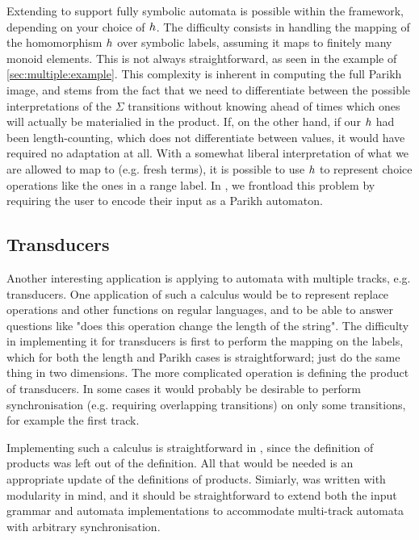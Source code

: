 \documentclass[acmsmall,review,anonymous,screen]{acmart}\settopmatter{printfolios=true,printccs=true,printacmref=true}
\theoremstyle{definition}
\begin{document}
Extending \Calculus{} to support fully symbolic automata is possible within the
framework, depending on your choice of $h$. The difficulty consists in
handling the mapping of the homomorphism $h$ over symbolic labels, assuming
it maps to finitely many monoid elements. This is not always straightforward, as
seen in the example of \cref{sec:multiple:example}. This complexity is inherent
in computing the full Parikh image, and stems from the fact that we need to
differentiate between the possible interpretations of the $\Sigma$ transitions
without knowing ahead of times which ones will actually be materialied in the
product. If, on the other hand, if our $h$ had been length-counting, which
does not differentiate between values, it would have required no adaptation at
all. With a somewhat liberal interpretation of what we are allowed to map to
(e.g. fresh terms), it is possible to use $h$ to represent choice operations
like the ones in a range label. In \Catra{}, we frontload this problem by
requiring the user to encode their input as a Parikh automaton. 

\subsection{Transducers}\label{sec:ext:transducers}

Another interesting application is applying \Calculus{} to automata with
multiple tracks, e.g. transducers. One application of such a calculus would be
to represent replace operations and other functions on regular languages, and to
be able to answer questions like "does this operation change the length of the
string". The difficulty in implementing it for transducers is first to perform
the mapping on the labels, which for both the length and Parikh cases is
straightforward; just do the same thing in two dimensions. The more complicated
operation is defining the product of transducers. In some cases it would
probably be desirable to perform synchronisation (e.g. requiring overlapping
transitions) on only some transitions, for example the first track.

Implementing such a calculus is straightforward in \Calculus, since the
definition of products was left out of the definition. All that would be needed
is an appropriate update of the definitions of products. Simiarly, \Catra was
written with modularity in mind, and it should be straightforward to extend both
the input grammar and automata implementations to accommodate multi-track
automata with arbitrary synchronisation.
\end{document}
